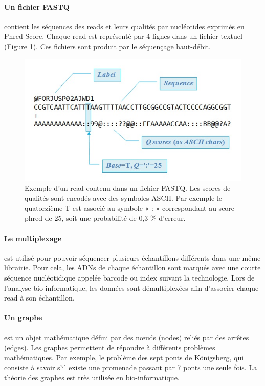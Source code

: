 \documentclass[12pt,a4paper]{article}
\begin{document}
\paragraph{Un fichier FASTQ} contient les séquences des reads et leurs qualités par nucléotides exprimés en Phred Score. Chaque read est représenté par 4 lignes dans un fichier textuel (Figure \ref{fastq}). Ces fichiers sont produit par le séquençage haut-débit.

\begin{figure}[!h]
\begin{center}
\includegraphics[scale=0.6]{img/fastq.jpg}\hfill
\end{center}
\caption{Exemple d'un read contenu dans un fichier FASTQ. Les scores de qualités sont encodés avec des symboles ASCII. Par exemple le quatorzième T  est associé au symbole « : » correspondant au score phred de 25, soit une probabilité de 0,3 \% d'erreur.}
\label{fastq}
\end{figure}

\paragraph{Le multiplexage} est utilisé pour pouvoir séquencer plusieurs échantillons différents dans une même librairie. Pour cela, les ADNs de chaque échantillon sont marqués avec une courte séquence nucléotidique appelée barcode ou index suivant la technologie. Lors de l'analyse bio-informatique, les données sont démultiplexées afin d'associer chaque read à son échantillon.

\paragraph{Un graphe} est un objet mathématique défini par des nœuds (nodes) reliés par des arrêtes (edges). Les graphes permettent de répondre à différents problèmes mathématiques. Par exemple, le problème des sept ponts de Königsberg, qui consiste à savoir s'il existe une promenade passant par 7 ponts une seule fois. La théorie des graphes est très utilisée en bio-informatique.
\end{document}
